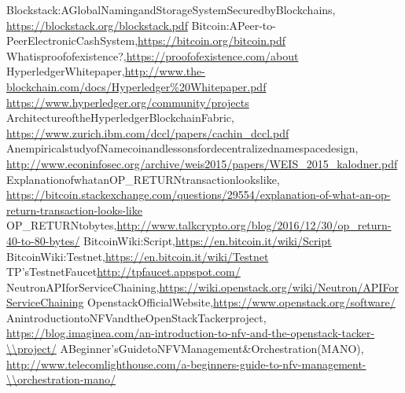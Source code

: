 \begin{thebibliography}{99}
Blockstack:\enspace A\enspace Global\enspace Naming\enspace and\enspace Storage\enspace System\enspace Secured\enspace by\enspace Blockchains,\\ \url{https://blockstack.org/blockstack.pdf}
Bitcoin:\enspace A\enspace Peer-to-Peer\enspace Electronic\enspace Cash\enspace System,\enspace \url{https://bitcoin.org/bitcoin.pdf} 
What\enspace is\enspace proof\enspace of\enspace existence\enspace ?,\enspace \url{https://proofofexistence.com/about}
Hyperledger\enspace Whitepaper,\enspace \url{http://www.the-blockchain.com/docs/Hyperledger\%20Whitepaper.pdf} 
\url{https://www.hyperledger.org/community/projects}
Architecture\enspace of\enspace the\enspace Hyperledger\enspace Blockchain\enspace Fabric,\\ \url{https://www.zurich.ibm.com/dccl/papers/cachin_dccl.pdf}
An\enspace empirical\enspace study\enspace of\enspace Namecoin\enspace and\enspace lessons\enspace for\enspace decentralized\enspace namespace\enspace design,\\ \url{http://www.econinfosec.org/archive/weis2015/papers/WEIS_2015_kalodner.pdf}
Explanation\enspace of\enspace what\enspace an\enspace OP\_RETURN\enspace transaction\enspace looks\enspace like,\\ \url{https://bitcoin.stackexchange.com/questions/29554/explanation-of-what-an-op-return-transaction-looks-like}
OP\_RETURN\enspace to\enspace bytes,\enspace \url{http://www.talkcrypto.org/blog/2016/12/30/op_return-40-to-80-bytes/}
Bitcoin\enspace Wiki:\enspace Script,\enspace \url{https://en.bitcoin.it/wiki/Script} 
Bitcoin\enspace Wiki:\enspace Testnet,\enspace \url{https://en.bitcoin.it/wiki/Testnet} 
TP's\enspace Testnet\enspace Faucet\enspace \url{http://tpfaucet.appspot.com/} 
Neutron\enspace API\enspace for\enspace Service\enspace Chaining,\enspace \url{https://wiki.openstack.org/wiki/Neutron/APIForServiceChaining}
Openstack\enspace Official\enspace Website,\enspace \url{https://www.openstack.org/software/} 
An\enspace introduction\enspace to\enspace NFV\enspace and\enspace the\enspace OpenStack\enspace Tacker\enspace project,\\ \url{https://blog.imaginea.com/an-introduction-to-nfv-and-the-openstack-tacker-\\project/}
A\enspace  Beginner's\enspace Guide\enspace to\enspace NFV\enspace Management\enspace \&\enspace Orchestration\enspace (MANO),\\ \url{http://www.telecomlighthouse.com/a-beginners-guide-to-nfv-management-\\orchestration-mano/}

\end{thebibliography}
